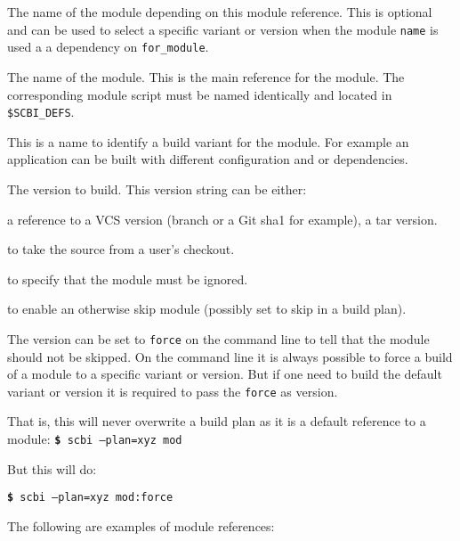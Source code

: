 \documentclass[a4paper,12pt,twoside]{article}
\newcommand{\code}[1]{\texttt{#1}}
\newcommand{\cmd}[1]{\tabto{1cm}\hspace{0.5cm}\texttt{\textbf{\$} #1}}
\begin{document}
\begin{description}[style=nextline]
	\item[for\_module] The name of the module depending on this module reference. This is optional and can be used to select a specific variant or version when the module \code{name} is used a a dependency on \code{for\_module}.

	\item[name] The name of the module. This is the main reference for the module. The corresponding module script must be named identically and located in \code{\$SCBI\_DEFS}.

	\item[variant] \label{variant}This is a name to identify a build variant for the module. For example an application can be built with different configuration and or dependencies.

	\item[version] The version to build. This version string can be either:

	\begin{description}[font=\texttt]
		\item[<VCS>] a reference to a VCS version (branch or a Git sha1 for example), a tar version.
		\item[dev] to take the source from a user's checkout.
		\item[kip] to specify that the module must be ignored.
		\item[force] to enable an otherwise skip module (possibly set to skip in a build plan).
	\end{description}

	The version can be set to \code{force} on the command line to tell that the module should not be skipped. On the command line it is always possible to force a build of a module to a specific variant or version. But if one need to build the default variant or version it is required to pass the \code{force} as version.

	That is, this will never overwrite a build plan as it is a default reference to a module:
	\cmd{scbi --plan=xyz mod}

	But this will do:

	\cmd{scbi --plan=xyz mod:force}
\end{description}

The following are examples of module references:
\end{document}
